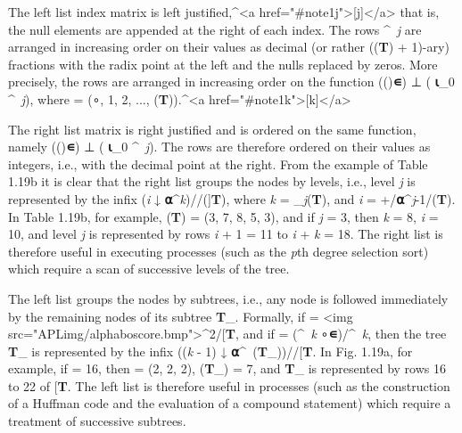 {\par The left list index matrix  is left justified,^{<a href="#note1j">[j]</a>} that is, the null elements are appended at the right of each index. The rows ^{\ \textit{j}} are arranged in increasing order on their values as decimal (or rather (\textit{\delta}(\textbf{T}) + 1)-ary) fractions with the radix point at the left and the nulls replaced by zeros. More precisely, the rows are arranged in increasing order on the function 
(\textit{\nu}()\textbf{∊}) ⊥ ( \textbf{⍳}_{0} 
^{\ \textit{j}}), where  = (∘, 1, 2, ..., \textit{\delta}(\textbf{T})).^{<a href="#note1k">[k]</a>}


\par The right list matrix is right justified and is ordered on the same function, namely (\textit{\nu}()\textbf{∊}) ⊥ ( \textbf{⍳}_{0} 
^{\ \textit{j}}). The rows are therefore ordered on their values as integers, i.e., with the decimal point at the right. From the example of Table 1.19b it is clear that the right list groups the nodes by levels, i.e., level \textit{j} is represented by the infix
(\textit{i} ↓ \textbf{⍺}^{\textit{k}})//(]\textbf{T}), where \textit{k} = \textbf{\mu}_{\textit{j}}(\textbf{T}), and \textit{i} = +/\textbf{⍺}^{\textit{j}-1}/\textbf{\mu}(\textbf{T}). In Table 1.19b, for example, 
\textbf{\mu}(\textbf{T}) = (3, 7, 8, 5, 3), and if 
\textit{j} = 3, then 
\textit{k} = 8, 
\textit{i} = 10, and level \textit{j} is represented by rows \textit{i} + 1 = 11 to \textit{i} + \textit{k} = 18. The right list is therefore useful in executing processes (such as the \textit{p}th degree selection sort) which require a scan of successive levels of the tree.

\par The left list groups the nodes by subtrees, i.e., any node  is followed immediately by the remaining nodes of its subtree 
\textbf{T}_{}. Formally, if 
 = <img src="APLimg/alphaboscore.bmp">^{2}/[\textbf{T}, and if  = (^{\textit{\ k}} \neq ∘\textbf{∊})/^{\textit{\ k}}, then the tree \textbf{T}_{} is represented by the infix
((\textit{k} - 1) ↓ \textbf{⍺}^{\textit{\ \mu}(\textbf{T}_{})})//[\textbf{T}. In Fig. 1.19a, for example, if 
 = 16, then 
 = (2, 2, 2),
\textit{\mu}(\textbf{T}_{}) = 7, and \textbf{T}_{} is represented by rows 16 to 22 of [\textbf{T}. The left list is therefore useful in processes (such as the construction of a Huffman code and the evaluation of a compound statement) which require a treatment of successive subtrees.

}

